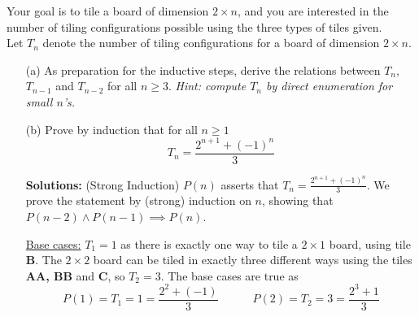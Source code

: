 \documentclass[11pt]{article}
\newif\ifsolutions
\renewcommand{\answer}[1]{{\color{mydarkblue}\textbf{Solutions: }#1}}
\begin{document}
\begin{qunlist}
Your goal is to tile a board of dimension $2 \times n$, and you are interested in the number of
tiling configurations possible using the three types of tiles given. \\
Let $T_n$ denote the number of tiling configurations for a board of dimension $2 \times n$.
\begin{itemize}
\item[(a)] As preparation for the inductive steps, derive the relations between $T_n$, $T_{n-1}$ 
and $T_{n-2}$ for all $n \geq 3$. \textit{Hint: compute $T_n$ by direct enumeration for small $n$'s.}

\ifsolutions
\answer{
\[ T_n = T_{n-1} + 2T_{n-2}, \quad \text{for all } n \geq 3 \]
We enumerate the tilings for a $2 \times n$ board by considering three cases depending on
the type of tile covering the bottom square of the first column. 
\begin{itemize}
\item[(i)] The tile is of type \textbf{A}: 
then the first two columns of the board must be tiled with \textbf{AA}.
The remaining $2 \times (n-2)$ board can be tiled in $T_{n-2}$ ways.
\item[(ii)] The tile is of type \textbf{B}: the first column is tiled with \textbf{B}, and
the remaining $2 \times (n-1)$ board can be tiled in $T_{n-1}$ ways.
\item[(iii)] The tile is of type \textbf{C}: the first two columns of the board are tiled with \textbf{C}, 
and the remaining $2 \times (n-2)$ board can be tiled in $T_{n-2}$ ways.
\end{itemize}
Note that the three cases are exhaustive and mutually exclusive. The number of tilings for a $2 \times n$
board therefore satisfies the recurrence relation as proposed.
}
\fi


\newpage

\item[(b)] Prove by induction that for all $n \geq 1$
\[ T_n = \frac{2^{n+1}+(-1)^n}{3} \]

\ifsolutions
\answer{
(Strong Induction) $P(n)$ asserts that $T_n = \frac{2^{n+1}+(-1)^n}{3}$. 
We prove the statement by (strong) induction on $n$, showing that $P(n-2) \wedge P(n-1) \implies P(n)$.

\underline{Base cases:} $T_1 = 1$ as there is exactly one way to tile a $2 \times 1$ board, 
using tile \textbf{B}.
The $2 \times 2$ board can be tiled in exactly three different ways 
using the tiles \textbf{AA, BB} and \textbf{C},
so $T_2 = 3$. The base cases are true as 
\[P(1)=T_1=1=\frac{2^2+(-1)}{3} \quad\quad\quad P(2)=T_2=3=\frac{2^3+1}{3}\]

}
\end{itemize}
\end{qunlist}
\end{document}
